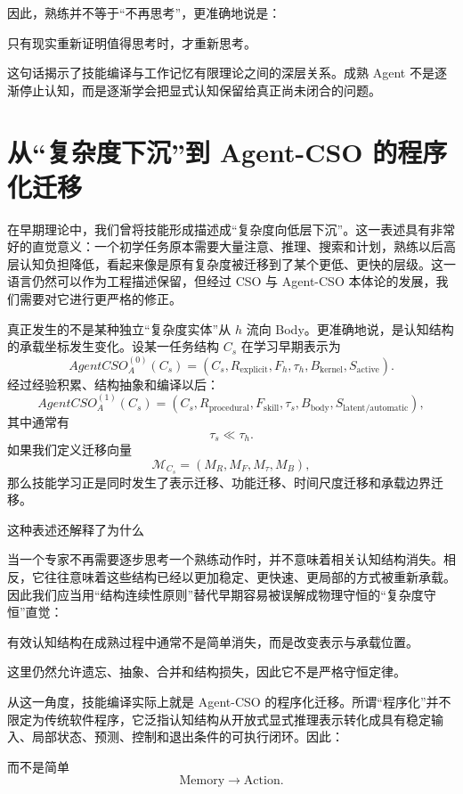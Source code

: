 因此，熟练并不等于“不再思考”，更准确地说是：
\begin{statementbox}
只有现实重新证明值得思考时，才重新思考。
\end{statementbox}
这句话揭示了技能编译与工作记忆有限理论之间的深层关系。成熟 Agent 不是逐渐停止认知，而是逐渐学会把显式认知保留给真正尚未闭合的问题。

\section{从“复杂度下沉”到 Agent-CSO 的程序化迁移}

在早期理论中，我们曾将技能形成描述成“复杂度向低层下沉”。这一表述具有非常好的直觉意义：一个初学任务原本需要大量注意、推理、搜索和计划，熟练以后高层认知负担降低，看起来像是原有复杂度被迁移到了某个更低、更快的层级。这一语言仍然可以作为工程描述保留，但经过 CSO 与 Agent-CSO 本体论的发展，我们需要对它进行更严格的修正。

真正发生的不是某种独立“复杂度实体”从 $h$ 流向 Body。更准确地说，是认知结构的承载坐标发生变化。设某一任务结构 $C_s$ 在学习早期表示为
\[
AgentCSO^{(0)}_A(C_s)
=
\left(
C_s,
R_{\mathrm{explicit}},
F_h,
\tau_h,
B_{\mathrm{kernel}},
S_{\mathrm{active}}
\right).
\]
经过经验积累、结构抽象和编译以后：
\[
AgentCSO^{(1)}_A(C_s)
=
\left(
C_s,
R_{\mathrm{procedural}},
F_{\mathrm{skill}},
\tau_s,
B_{\mathrm{body}},
S_{\mathrm{latent/automatic}}
\right),
\]
其中通常有
\[
\tau_s\ll\tau_h.
\]
如果我们定义迁移向量
\[
\mathcal M_{C_s}
=
\left(
M_R,
M_F,
M_\tau,
M_B
\right),
\]
那么技能学习正是同时发生了表示迁移、功能迁移、时间尺度迁移和承载边界迁移。

这种表述还解释了为什么
\begin{statementbox}
\centering
{}
\end{statementbox}
当一个专家不再需要逐步思考一个熟练动作时，并不意味着相关认知结构消失。相反，它往往意味着这些结构已经以更加稳定、更快速、更局部的方式被重新承载。因此我们应当用“结构连续性原则”替代早期容易被误解成物理守恒的“复杂度守恒”直觉：
\begin{proposition*}
有效认知结构在成熟过程中通常不是简单消失，而是改变表示与承载位置。
\end{proposition*}
这里仍然允许遗忘、抽象、合并和结构损失，因此它不是严格守恒定律。

从这一角度，技能编译实际上就是 Agent-CSO 的程序化迁移。所谓“程序化”并不限定为传统软件程序，它泛指认知结构从开放式显式推理表示转化成具有稳定输入、局部状态、预测、控制和退出条件的可执行闭环。因此：
\begin{statementbox}
\centering
{}
\end{statementbox}
而不是简单
\[
\mathrm{Memory}
\rightarrow
\mathrm{Action}.
\]

